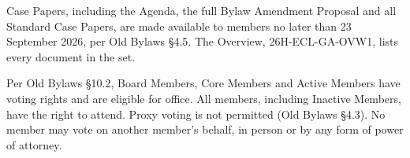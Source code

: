 \documentclass{../../../Common/Latex/Templates/rapport}
\begin{document}
Case Papers, including the Agenda, the full Bylaw Amendment Proposal and all Standard Case Papers, are made available to members no later than 23 September 2026, per Old Bylaws \S4.5. The Overview, 26H-ECL-GA-OVW1, lists every document in the set.

Per Old Bylaws \S10.2, Board Members, Core Members and Active Members have voting rights and are eligible for office. All members, including Inactive Members, have the right to attend. Proxy voting is not permitted (Old Bylaws \S4.3). No member may vote on another member's behalf, in person or by any form of power of attorney.
\end{document}

